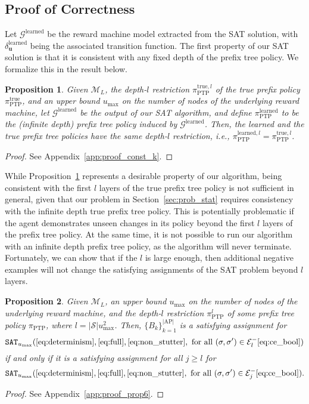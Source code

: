 \documentclass[letterpaper, 10 pt, conference]{ieeeconf}
\newcommand{\ptp}{\pi_{\mathrm{PTP}}}
\newtheorem{proposition}{\textbf{Proposition}}
\newcommand{\sectionref}[1]{Section~\ref{#1}}
\newcommand{\appendixref}[1]{Appendix~\ref{#1}}
\begin{document}
\subsection{Proof of Correctness}\label{sec:proof}
Let $\mathcal{G}^{\mathrm{learned}}$ be the reward machine model extracted from the SAT solution, with $\delta_\mathbf{u}^{\mathrm{learned}}$ being the associated transition function. The first property of our SAT solution is that it is consistent with any fixed depth of the prefix tree policy. We formalize this in the result below.
\begin{proposition}\label{prop:const_k}
    Given $\mathcal{M}_L$, the depth-$l$ restriction $\ptp^{\mathrm{true},l}$ of the true prefix policy $\ptp^{\mathrm{true}}$, and an upper bound $u_{\mathrm{max}}$ on the number  of nodes of the underlying reward machine, let $\mathcal{G}^{\mathrm{learned}}$ be the output of our SAT algorithm, and define $\ptp^{\mathrm{learned}}$ to be the (infinite depth) prefix tree policy induced by $\mathcal{G}^{\mathrm{learned}}$. Then, the learned and the true prefix tree policies have the same depth-$l$ restriction, i.e., $\ptp^{\mathrm{learned},l}=\ptp^{\mathrm{true},l}$. 
\end{proposition}
\begin{proof}
    See \appendixref{app:proof_const_k}.
\end{proof}

While Proposition~\ref{prop:const_k} represents a desirable property of our algorithm, being consistent with the first $l$ layers of the true prefix tree policy is not sufficient in general, given that our problem in \sectionref{sec:prob_stat} requires consistency with the infinite depth true prefix tree policy. This is potentially problematic if the agent demonstrates unseen changes in its policy beyond the first $l$ layers of the prefix tree policy. At the same time, it is not possible to run our algorithm with an infinite depth prefix tree policy, as the algorithm will never terminate. Fortunately, we can show that if the $l$ is large enough, then additional negative examples will not change the satisfying assignments of the SAT problem beyond $l$ layers.


\begin{proposition} \label{prop:prop6} 
Given $\mathcal{M}_L$,  an upper bound $u_{\mathrm{max}}$ on the number of nodes of the underlying reward machine, and the depth-$l$ restriction $\ptp^l$ of some prefix tree policy $\ptp$, where $l = |\mathcal{S}|u_{\mathrm{max}}^2$. Then, $\{B_k\}_{k=1}^{|\mathrm{AP}|}$ is a satisfying assignment for $$\texttt{SAT}_{u_{\mathrm{max}}}(\eqref{eq:determinism}, \eqref{eq:full}, \eqref{eq:non_stutter}, \text{ for all } (\sigma,\sigma')\in \mathcal{E}^{-}_l \eqref{eq:ce_bool})$$ 
if and only if it is a satisfying assignment for all $j\geq l$ for $$\texttt{SAT}_{u_{\mathrm{max}}}(\eqref{eq:determinism}, \eqref{eq:full}, \eqref{eq:non_stutter}, \text{ for all } (\sigma,\sigma')\in \mathcal{E}^{-}_j \eqref{eq:ce_bool}).$$
\end{proposition}
\begin{proof} See \appendixref{app:proof_prop6}.
\end{proof}
\end{document}
